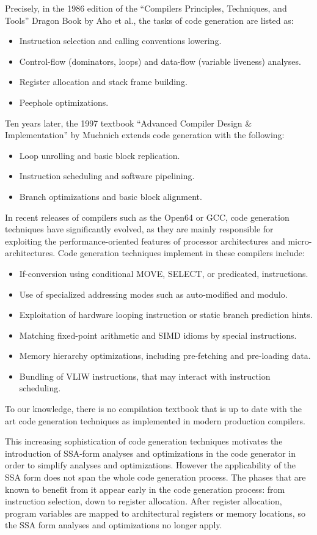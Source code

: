 Precisely, in the 1986 edition of
the ``Compilers Principles, Techniques, and Tools'' Dragon Book by Aho et al.,
the tasks of code generation are listed as:
\begin{itemize}
\item Instruction selection and calling conventions lowering.
\item Control-flow (dominators, loops) and data-flow (variable liveness) analyses.
\item Register allocation and stack frame building.
\item Peephole optimizations.
\end{itemize}
Ten years later, the 1997 textbook ``Advanced Compiler Design \& Implementation''
by Muchnich extends code generation with the following: \begin{itemize}
\item Loop unrolling and basic block replication.
\item Instruction scheduling and software pipelining.
\item Branch optimizations and basic block alignment.
\end{itemize}
In recent releases of compilers such as the Open64 or GCC, code generation
techniques have significantly evolved, as they are mainly responsible for
exploiting the performance-oriented features of processor architectures and
micro-architectures. Code generation techniques implement in these compilers
include: \begin{itemize}
\item If-conversion using conditional MOVE, SELECT, or predicated, instructions.
\item Use of specialized addressing modes such as auto-modified and modulo.
\item Exploitation of hardware looping instruction or static branch prediction
hints.
\item Matching fixed-point arithmetic and SIMD idioms by special instructions.
\item Memory hierarchy optimizations, including pre-fetching and pre-loading
data.
\item Bundling of VLIW instructions, that may interact with instruction
scheduling.
\end{itemize}
To our knowledge, there is no compilation textbook that is up to date with the
art code generation techniques as implemented in modern production compilers.
\medskip

This increasing sophistication of code generation techniques motivates the
introduction of SSA-form analyses and optimizations in the code generator in
order to simplify analyses and optimizations. However the applicability of the SSA
form does not span the whole code generation process. The phases that are known
to benefit from it appear early in the code generation process: from instruction
selection, down to register allocation. After register allocation, program
variables are mapped to architectural registers or memory locations, so the SSA
form analyses and optimizations no longer apply.

